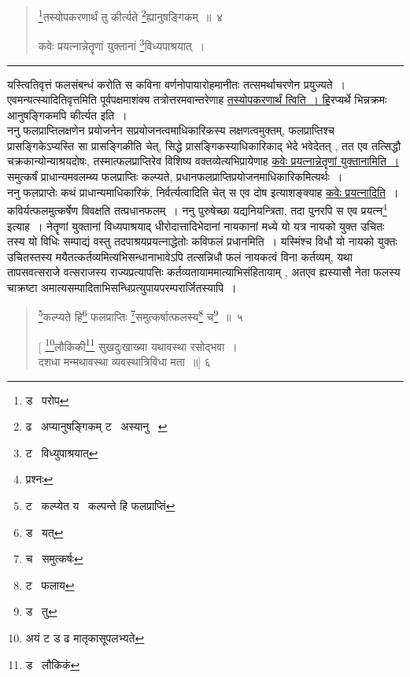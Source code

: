\documentclass[11pt, openany]{book}
\begin{document}
\begin{quote}
{\na \renewcommand{\thefootnote}{1}\footnote{ड \textendash\ परोप}तस्योपकरणार्थं तु कीर्त्यते \renewcommand{\thefootnote}{2}\footnote{ढ \textendash\ अप्यानुषङ्गिकम् ट \textendash\ अस्यानु \textendash\ }ह्यानुषङ्गिकम्~॥~४

कवेः प्रयत्नान्नेतॄणां युक्तानां \renewcommand{\thefootnote}{3}\footnote{ट \textendash\ विध्युपाश्रयात्}विध्यपाश्रयात्~।}
\end{quote}

\hrule

\vspace{2mm}
\noindent
यस्त्वितिवृत्तं फलसंबन्धं करोति स कविना वर्णनोपायारोहमानीतः तत्समर्थाचरणेन प्रयुज्यते~। एवमन्यत्स्यादितिवृत्तमिति पूर्वपक्षमाशंक्य तत्रोत्तरमवान्तरेणाह \underline{तस्योपकरणार्थं त्विति~। हि}रप्यर्थे भिन्नक्रमः आनुषङ्गिकमपि कीर्त्यत इति~।\\

ननु फलप्राप्तिलक्षणेन प्रयोजनेन सप्रयोजनत्वमाधिकारिकस्य लक्षणत्वमुक्तम्, फलप्राप्तिश्च प्रासङ्गिकेऽप्यस्ति सा प्रासङ्गिकीति चेत्, सिद्धे प्रासङ्गिकस्याधिकारिकाद् भेदे भवेदेतत् , तत एव तत्सिद्धौ चक्रकान्योन्याश्रयदोषः, तस्मात्फलप्राप्तिरेव विशिष्य वक्तव्येत्यभिप्रायेणाह \underline{कवेः प्रयत्नान्नेतॄणां युक्तानामिति~।} समुत्कर्षं प्राधान्यमवलम्ब्य फलप्राप्तिः कल्प्यते, प्रधानफलप्राप्तिप्रयोजनमाधिकारिकमित्यर्थः~।\\

ननु फलप्राप्तेः कथं प्राधान्यमाधिकारिकं, निर्वर्त्यत्वादिति चेत् स एव दोष इत्याशङ्क्याह \underline{कवेः प्रयत्नादिति}~। कविर्यत्फलमुत्कर्षेण विवक्षति तत्प्रधानफलम्~। ननु पुरुषेच्छा यद्यनियन्त्रिता, तदा पुनरपि स एव प्रयत्न\renewcommand{\thefootnote}{4}\footnote{प्रश्नः} इत्याह~। नेतॄणां युक्तानां विध्यपाश्रयाद् धीरोदात्तादिभेदानां नायकानां मध्ये यो यत्र नायको युक्त उचितः तस्य यो विधिः सम्पाद्यं वस्तु तदपाश्रयप्रयत्नाद्धेतोः कविफलं प्रधानमिति~। यस्मिंश्च विधौ यो नायको युक्तः उचितस्तस्य मयैतत्कर्तव्यमित्यभिसन्धानाभावेऽपि तत्सन्निधौ फलं नायकत्वं विना कर्तव्यम्, यथा तापसवत्सराजे वत्सराजस्य राज्यप्रत्यापत्तिः कर्तव्यतायाममात्याभिसंहितायाम् , अतएव ह्यस्यासौ नेता फलस्य चाक्रष्टा अमात्यसम्पादिताभिसन्धिप्रत्युपायपरम्परार्जितस्यापि~।

\newpage

\begin{quote}
{\na \renewcommand{\thefootnote}{1}\footnote{ट \textendash\ कल्प्येत य \textendash\ कल्पन्ते हि फलप्राप्तिं}कल्प्यते हि\renewcommand{\thefootnote}{2}\footnote{ड \textendash\ यत्} फलप्राप्तिः \renewcommand{\thefootnote}{3}\footnote{च \textendash\ समुत्कर्षः}समुत्कर्षात्फलस्य\renewcommand{\thefootnote}{4}\footnote{ट \textendash\ फलाय} च\renewcommand{\thefootnote}{5}\footnote{ड \textendash\ तु}~॥~५

[ \renewcommand{\thefootnote}{6}\footnote{अयं ट ड ढ मातृकासूपलभ्यते}लौकिकी\renewcommand{\thefootnote}{7}\footnote{ड \textendash\ लौकिकं} सुखदुःखाख्या यथावस्था रसोद्भवा~।\\
 दशधा मन्मथावस्था व्यवस्थात्रिविधा मता~॥] ६}
\end{quote}
\end{document}
